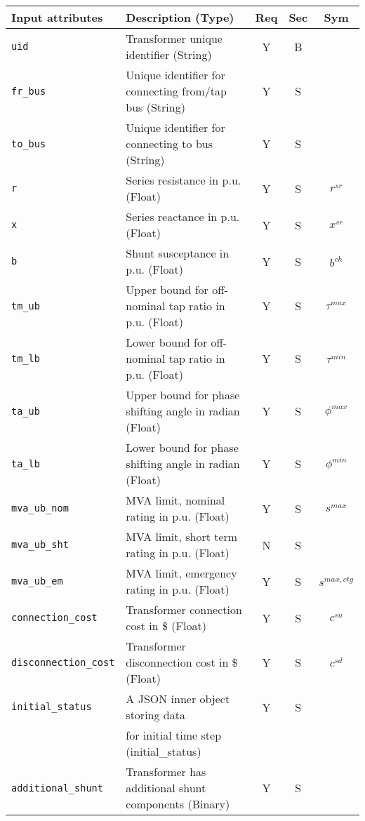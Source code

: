 \documentclass{article}
\begin{document}
\begin{center}
\small
\begin{tabular}{ l | l | c | c | c |}
Input attributes & Description (Type) & Req & Sec & Sym\\
\hline
  {\tt uid} & Transformer unique identifier (String)& Y & B & \\
  {\tt fr\_bus} & Unique identifier for connecting from/tap bus (String)& Y & S & \\
  {\tt to\_bus} & Unique identifier for connecting to bus (String)& Y & S & \\
  {\tt r} & Series resistance in p.u. (Float)& Y & S & $r^{sr}$\\
  {\tt x} & Series reactance  in p.u. (Float)& Y & S & $x^{sr}$\\
  {\tt b} & Shunt susceptance in p.u. (Float)& Y & S & $b^{ch}$ \\
  {\tt tm\_ub} & Upper bound for off-nominal tap ratio in p.u. (Float)& Y & S & $\tau^{max}$\\
  {\tt tm\_lb} & Lower bound for off-nominal tap ratio in p.u. (Float)& Y & S & $\tau^{min}$\\
  {\tt ta\_ub} & Upper bound for phase shifting angle in radian (Float)& Y & S & $\phi^{max}$\\
  {\tt ta\_lb} & Lower bound for phase shifting angle in radian (Float)& Y & S & $\phi^{min}$\\
  {\tt mva\_ub\_nom} & MVA limit, nominal rating in p.u. (Float) & Y & S & $s^{max}$ \\
  {\tt mva\_ub\_sht} & MVA limit, short term rating in p.u. (Float) & N & S &  \\
  {\tt mva\_ub\_em} & MVA limit, emergency rating in p.u. (Float) & Y & S & $s^{max,ctg}$ \\
  {\tt connection\_cost} &  Transformer connection cost in \$ (Float) & Y & S & $c^{su}$\\
  {\tt disconnection\_cost} & Transformer disconnection cost in \$ (Float) & Y & S & $c^{sd}$\\
  {\tt initial\_status} & A JSON inner object storing data  & Y & S &  \\
       & for initial time step (initial\_status) &  &  &  \\
  {\tt additional\_shunt} & Transformer has additional shunt components (Binary)& Y & S & \\
  \hline
\end{tabular}
\end{center}
  
\end{document}
